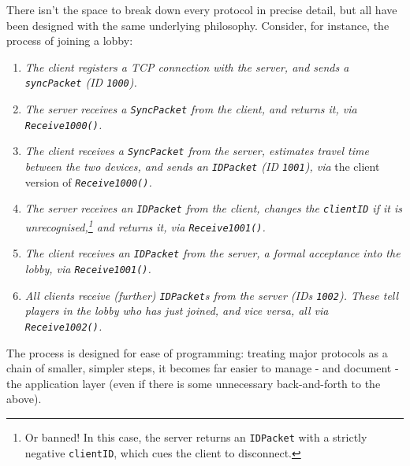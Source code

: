 \documentclass[a4paper, 9pt]{article}
\begin{document}
\begin{flushleft}
\vspace{5pt}\noindent
There isn't the space to break down every protocol in precise detail, but all have been designed with the same underlying philosophy. Consider, for instance, the process of joining a lobby:
\begin{enumerate}[label=\textit{\arabic*}\textit{.}, noitemsep]
\item \textit{The client registers a TCP connection with the server, and sends a \texttt{syncPacket} (ID \texttt{1000}).} %
\item \textit{The server receives a \texttt{SyncPacket} from the client, and returns it, via \texttt{Receive1000()}.} %
\item \textit{The client receives a \texttt{SyncPacket} from the server, estimates travel time between the two devices, and sends an \texttt{IDPacket} (ID \texttt{1001}), via} the client version of \textit{\texttt{Receive1000()}.} %
\item \textit{The server receives an \texttt{IDPacket} from the client, changes the \texttt{clientID} if it is unrecognised,\footnote{Or banned! In this case, the server returns an \texttt{IDPacket} with a strictly negative \texttt{clientID}, which cues the client to disconnect.} and returns it, via \texttt{Receive1001()}.} %
\item \textit{The client receives an \texttt{IDPacket} from the server, a formal acceptance into the lobby, via \texttt{Receive1001()}.} %
\item \textit{All clients receive (further) \texttt{IDPacket}s from the server (IDs \texttt{1002}). These tell players in the lobby who has just joined, and vice versa, all via \texttt{Receive1002()}.}
\end{enumerate}
The process is designed for ease of programming: treating major protocols as a chain of smaller, simpler steps, it becomes far easier to manage - and document - the application layer (even if there is some unnecessary back-and-forth to the above).



\end{flushleft}
\end{document}
